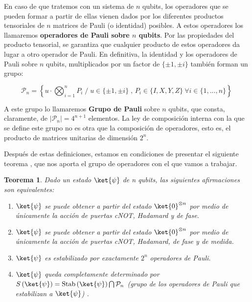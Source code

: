 \documentclass[11pt,a4paper,twoside,pdf]{article}
\numberwithin{equation}{section}
\newtheorem{theorem}{Teorema}
\begin{document}
		En caso de que tratemos con un sistema de $n$ qubits, los operadores que se pueden formar a partir de ellas vienen dados por los diferentes productos tensoriales de $n$ matrices de Pauli (o identidad) posibles. A estos operadores los llamaremos \textbf{operadores de Pauli sobre $n$  qubits}. Por las propiedades del producto tensorial, se garantiza que cualquier producto de estos operadores da lugar a otro operador de Pauli. En definitiva, la identidad y los operadores de Pauli sobre $n$ qubits, multiplicados por un factor de $\{\pm 1,\pm i\}$  también forman un grupo:
	
			\begin{equation} \label{eq: Grupo de Pauli}
				\mathcal{P}_n = \left\{ u \cdot \displaystyle\bigotimes_{i=1}^{n} P_i 		\; / \;
				u\in\{\pm1,\pm i\} \; , \,	P_i \in \{I,X,Y,Z\}  \ \forall i \in \{1,...,n\} \right\}		\,
			\end{equation}
		
		A este grupo lo llamaremos \textbf{Grupo de Pauli} sobre $n$ qubits, que consta, claramente, de $|\mathcal{P}_n|=4^{n+1}$ elementos. La ley de composición interna con la que se define este grupo no es otra que la composición de operadores, esto es, el producto de matrices unitarias de dimensión $2^n$.
	
		Después de estas definiciones, estamos en condiciones de presentar el siguiente teorema \cite{Aaronson}, que nos aporta el grupo de operadores con el que vamos a trabajar.
		
			\begin{theorem} \label{th: Caracterizacion}
				Dado un estado $\ket{\psi}$ de n qubits, las siguientes afirmaciones son equivalentes:
				\begin{enumerate}[label=(\roman*),itemsep=1pt]
					\item \label{th: CaracterizacionI}$\ket{\psi}$ se puede obtener a partir del estado $\ket{0}^{\otimes n}$ por medio de únicamente la acción de puertas cNOT, Hadamard y de fase.
					\item \label{th: CaracterizacionII}$\ket{\psi}$ se puede obtener a partir del estado $\ket{0}^{\otimes n}$ por medio de únicamente la acción de puertas cNOT, Hadamard, de fase y de medida.
					\item \label{th: CaracterizacionIII} $\ket{\psi}$ es estabilizado por exactamente $2^n$ operadores de Pauli.
					\item \label{th: CaracterizacionIV} $\ket{\psi}$ queda completamente determinado por $S \left( \ket{\psi} \right) = \text{Stab}\left( \ket{\psi}\right) \bigcap \mathcal{P}_n$ (grupo de los operadores de Pauli que estabilizan a $\ket{\psi}$) .
				\end{enumerate}
			\end{theorem}
		
\end{document}
